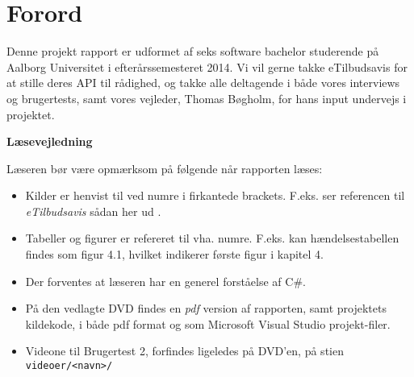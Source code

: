 \chapter*{Forord}

Denne projekt rapport er udformet af seks software bachelor studerende på Aalborg Universitet i efterårssemesteret 2014.
Vi vil gerne takke eTilbudsavis for at stille deres API til rådighed, og takke alle deltagende i både vores interviews og brugertests, samt vores vejleder, Thomas Bøgholm, for hans input undervejs i projektet.

\textbf{Læsevejledning}

Læseren bør være opmærksom på følgende når rapporten læses:

\begin{itemize}
	\item Kilder er henvist til ved numre i firkantede brackets. 
	F.eks. ser referencen til \textit{eTilbudsavis} sådan her ud \citep{eTilAPI}.
	\item Tabeller og figurer er refereret til vha. numre. F.eks. kan hændelsestabellen findes som figur 4.1, hvilket indikerer første figur i kapitel 4.
	\item Der forventes at læseren har en generel forståelse af C\#.
	\item På den vedlagte DVD findes en \textit{pdf} version af rapporten, samt projektets kildekode, i både pdf format og som Microsoft Visual Studio projekt-filer.
	\item Videone til Brugertest 2, forfindes ligeledes på DVD'en, på stien \texttt{videoer/<navn>/}  
\end{itemize}